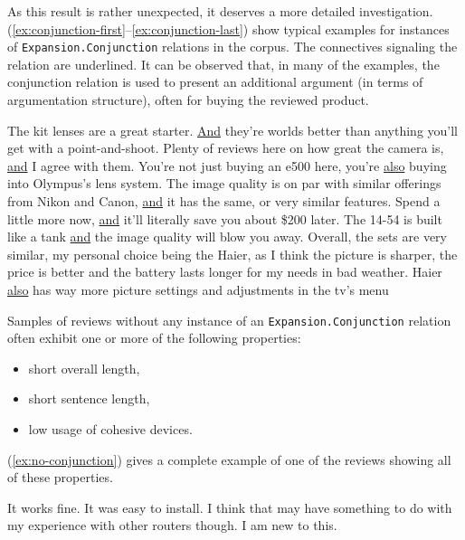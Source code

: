 \documentclass[
    a4paper,%
    12pt,%
    oneside,%
    toc=bibliography,
    final,
]{scrartcl}
\begin{document}
As this result is rather unexpected, it deserves a more detailed investigation. (\ref{ex:conjunction-first}–\ref{ex:conjunction-last}) show typical examples for instances of \lstinline|Expansion.Conjunction| relations in the corpus. The connectives signaling the relation are underlined. It can be observed that, in many of the examples, the conjunction relation is used to present an additional argument (in terms of argumentation structure), often for buying the reviewed product.

\begin{exe}
\ex \label{ex:conjunction-first} The kit lenses are a great starter. \underline{And} they're worlds better than anything you'll get with a point-and-shoot.
\ex Plenty of reviews here on how great the camera is, \underline{and} I agree with them.
\ex You're not just buying an e500 here, you're \underline{also} buying into Olympus's lens system.
\ex The image quality is on par with similar offerings from Nikon and Canon, \underline{and} it has the same, or very similar features.
\ex Spend a little more now, \underline{and} it'll literally save you about \$200 later.
\ex The 14-54 is built like a tank \underline{and} the image quality will blow you away.
\ex \label{ex:conjunction-last} Overall, the sets are very similar, my personal choice being the Haier, as I think the picture is sharper, the price is better and the battery lasts longer for my needs in bad weather. Haier \underline{also} has way more picture settings and adjustments in the tv's menu
\end{exe}

Samples of reviews without any instance of an \lstinline|Expansion.Conjunction| relation often exhibit one or more of the following properties:

\begin{itemize}
\item short overall length,
\item short sentence length,
\item low usage of cohesive devices.
\end{itemize}

(\ref{ex:no-conjunction}) gives a complete example of one of the reviews showing all of these properties.

\begin{exe}
\ex \label{ex:no-conjunction} It works fine.  It was easy to install.  I think that may have something to do with my experience with other routers though.  I am new to this.
\end{exe}
\end{document}
